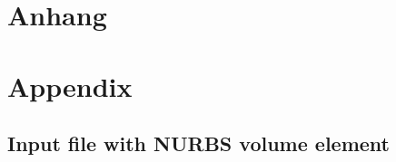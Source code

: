 \ifx\lan\deutsch 
\chapter{Anhang}
\label{sec:anhang}
\else
\chapter{Appendix}
\label{sec:appendix}
\fi

\section{Input file with NURBS volume element}
\label{app:NURBSVolumenelement}

